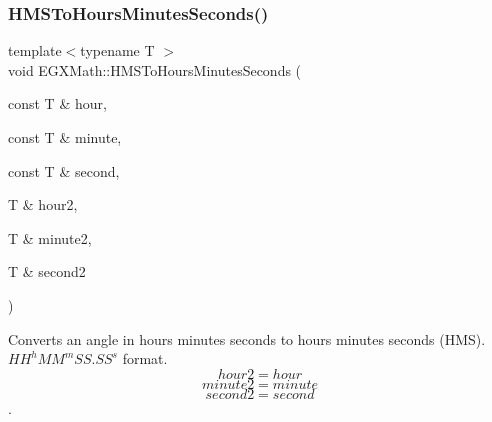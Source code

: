 \subsubsection{\texorpdfstring{H\+M\+S\+To\+Hours\+Minutes\+Seconds()}{HMSToHoursMinutesSeconds()}}
{\footnotesize\ttfamily template$<$typename T $>$ \\
void E\+G\+X\+Math\+::\+H\+M\+S\+To\+Hours\+Minutes\+Seconds (\begin{DoxyParamCaption}\item[{const T \&}]{hour,  }\item[{const T \&}]{minute,  }\item[{const T \&}]{second,  }\item[{T \&}]{hour2,  }\item[{T \&}]{minute2,  }\item[{T \&}]{second2 }\end{DoxyParamCaption})}



Converts an angle in hours minutes seconds to hours minutes seconds (H\+MS). ${HH}^h{MM}^m{SS.SS}^s$ format. \[hour2 = hour \] \[minute2 = minute\] \[second2 = second\]. 

